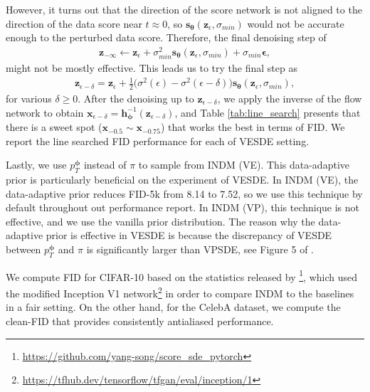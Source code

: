 \documentclass{article}
\theoremstyle{definition}
\theoremstyle{remark}
\begin{document}
	However, it turns out that the direction of the score network is not aligned to the direction of the data score near $t\approx 0$, so $\mathbf{s}_{\bm{\theta}}(\mathbf{z}_{\epsilon},\sigma_{min})$ would not be accurate enough to the perturbed data score. Therefore, the final denoising step of
	\begin{align*}\mathbf{z}_{-\infty}\leftarrow\mathbf{z}_{\epsilon}+\sigma_{min}^{2}\mathbf{s}_{\bm{\theta}}(\mathbf{z}_{\epsilon},\sigma_{min})+\sigma_{min}\bm{\epsilon},
	\end{align*}
	might not be mostly effective. This leads us to try the final step as
	\begin{align*}\mathbf{z}_{\epsilon-\delta}=\mathbf{z}_{\epsilon}+\frac{1}{2}\Big(\sigma^{2}(\epsilon)-\sigma^{2}(\epsilon-\delta)\Big)\mathbf{s}_{\bm{\theta}}(\mathbf{z}_{\epsilon},\sigma_{min}),
	\end{align*}
	for various $\delta\ge 0$. After the denoising up to $\mathbf{z}_{\epsilon-\delta}$, we apply the inverse of the flow network to obtain $\mathbf{x}_{\epsilon-\delta}=\mathbf{h}_{\bm{\phi}}^{-1}(\mathbf{z}_{\epsilon-\delta})$, and Table \ref{tab:line_search} presents that there is a sweet spot ($\mathbf{x}_{-0.5}\sim\mathbf{x}_{-0.75}$) that works the best in terms of FID. We report the line searched FID performance for each of VESDE setting. 
	
	Lastly, we use $p_{T}^{\bm{\phi}}$ instead of $\pi$ to sample from INDM (VE). This data-adaptive prior is particularly beneficial on the experiment of VESDE. In INDM (VE), the data-adaptive prior reduces FID-5k from 8.14 to 7.52, so we use this technique by default throughout out performance report. In INDM (VP), this technique is not effective, and we use the vanilla prior distribution. The reason why the data-adaptive prior is effective in VESDE is because the discrepancy of VESDE between $p_{T}^{\bm{\phi}}$ and $\pi$ is significantly larger than VPSDE, see Figure 5 of \citet{chen2021likelihood}.
	
	We compute FID \citep{heusel2017gans} for CIFAR-10 based on the statistics released by \citet{song2020score}\footnote{\url{https://github.com/yang-song/score_sde_pytorch}}, which used the modified Inception V1 network\footnote{\url{https://tfhub.dev/tensorflow/tfgan/eval/inception/1}} in order to compare INDM to the baselines \citep{song2020score, song2021maximum} in a fair setting. On the other hand, for the CelebA dataset, we compute the clean-FID \citep{parmar2022aliased} that provides consistently antialiased performance.
	
\end{document}
